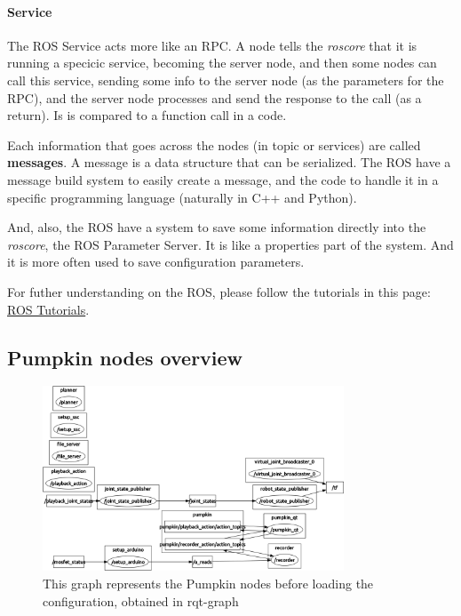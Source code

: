 \documentclass[oneside,a4paper,titlepage]{article}
\begin{document}
\paragraph{Service} The ROS Service acts more like an RPC. A node tells the \emph{roscore} that it is running a specicic service, becoming the server node, and then some nodes can call this service, sending some info to the server node (as the parameters for the RPC), and the server node processes and send the response to the call (as a return). {\color{blue} Is is compared to a function call in a code.}

Each information that goes across the nodes (in topic or services) are called \textbf{messages}. A message is a data structure that can be serialized. The ROS have a message build system to easily create a message, and the code to handle it in a specific programming language (naturally in C++ and Python).

And, also, the ROS have a system to save some information directly into the \emph{roscore}, the ROS Parameter Server. It is like a properties part of the system. And it is more often used to save configuration parameters.

For futher understanding on the ROS, please follow the tutorials in this page:
\href{http://wiki.ros.org/ROS/Tutorials}{ROS Tutorials}.

\subsection{Pumpkin nodes overview}

\begin{figure}[ht!]
	\centering
	\includegraphics[width=0.8\textwidth]{graph1}
	\caption[Pumpkin Nodes 1]{This graph represents the Pumpkin nodes before loading the configuration, obtained in rqt-graph}
	\label{fig:nodes1}
\end{figure}
\end{document}
